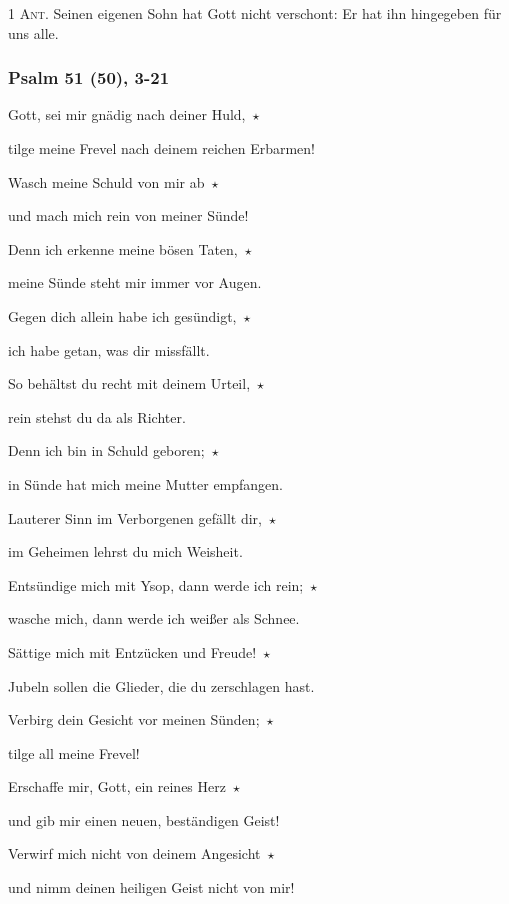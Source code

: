 \noindent \textsc{1 Ant.} Seinen eigenen Sohn hat Gott nicht verschont: Er hat ihn hingegeben für uns alle.

\subsubsection{Psalm 51 (50), 3-21}

\noindent Gott, sei mir gnädig nach deiner Huld,~$\star$~\nopagebreak

tilge meine Frevel nach deinem reichen Erbarmen!

\noindent Wasch meine Schuld von mir ab~$\star$~\nopagebreak

und mach mich rein von meiner Sünde!

\noindent Denn ich erkenne meine bösen Taten,~$\star$~\nopagebreak

meine Sünde steht mir immer vor Augen.

\noindent Gegen dich allein habe ich gesündigt,~$\star$~\nopagebreak

ich habe getan, was dir missfällt. 

\noindent So behältst du recht mit deinem Urteil,~$\star$~\nopagebreak

rein stehst du da als Richter.

\noindent Denn ich bin in Schuld geboren;~$\star$~\nopagebreak

in Sünde hat mich meine Mutter empfangen.

\noindent Lauterer Sinn im Verborgenen gefällt dir,~$\star$~\nopagebreak

im Geheimen lehrst du mich Weisheit.

\noindent Entsündige mich mit Ysop, dann werde ich rein;~$\star$~\nopagebreak

wasche mich, dann werde ich weißer als Schnee.

\noindent Sättige mich mit Entzücken und Freude!~$\star$~\nopagebreak

Jubeln sollen die Glieder, die du zerschlagen hast.

\noindent Verbirg dein Gesicht vor meinen Sünden;~$\star$~\nopagebreak

tilge all meine Frevel!

\noindent Erschaffe mir, Gott, ein reines Herz~$\star$~\nopagebreak

und gib mir einen neuen, beständigen Geist!

\noindent Verwirf mich nicht von deinem Angesicht~$\star$~\nopagebreak

und nimm deinen heiligen Geist nicht von mir!

